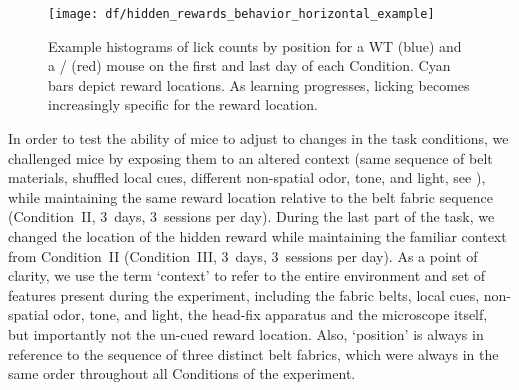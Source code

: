 \begin{figure}
	\centering
	\texttt{[image: df/hidden\_rewards\_behavior\_horizontal\_example]}
	\caption[Example histograms of lick counts by position]{Example histograms of lick counts by position for a WT (blue) and a \df/ (red) mouse on the first and last day of each Condition. Cyan bars depict reward locations. As learning progresses, licking becomes increasingly specific for the reward location.}
	\label{fig:df:licktograms}
\end{figure}
In order to test the ability of mice to adjust to changes in the task conditions, we challenged mice by exposing them to an altered context (same sequence of belt materials, shuffled local cues, different non-spatial odor, tone, and light, see ), while maintaining the same reward location relative to the belt fabric sequence (Condition~II, 3~days, 3~sessions per day). During the last part of the task, we changed the location of the hidden reward while maintaining the familiar context from Condition~II (Condition~III, 3~days, 3~sessions per day). As a point of clarity, we use the term `context' to refer to the entire environment and set of features present during the experiment, including the fabric belts, local cues, non-spatial odor, tone, and light, the head-fix apparatus and the microscope itself, but importantly not the un-cued reward location. Also, `position' is always in reference to the sequence of three distinct belt fabrics, which were always in the same order throughout all Conditions of the experiment.

